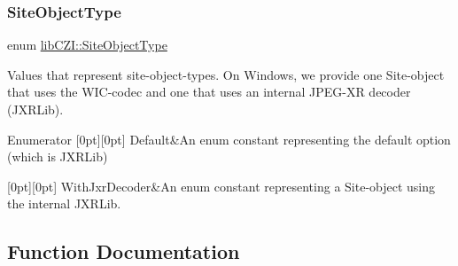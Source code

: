 \mbox{\label{namespacelib_c_z_i_a77743727a5f0709a64237e58b9254983}} 
\subsubsection{\texorpdfstring{Site\+Object\+Type}{SiteObjectType}}
{\footnotesize\ttfamily enum \hyperlink{namespacelib_c_z_i_a77743727a5f0709a64237e58b9254983}{lib\+C\+Z\+I\+::\+Site\+Object\+Type}\hspace{0.3cm}{\ttfamily [strong]}}

Values that represent site-\/object-\/types. On Windows, we provide one Site-\/object that uses the W\+I\+C-\/codec and one that uses an internal J\+P\+E\+G-\/\+XR decoder (J\+X\+R\+Lib). \begin{DoxyEnumFields}{Enumerator}
[0pt][0pt]{}\mbox{\label{namespacelib_c_z_i_a77743727a5f0709a64237e58b9254983a7a1920d61156abc05a60135aefe8bc67}} 
Default&An enum constant representing the default option (which is J\+X\+R\+Lib) \\
\hline

[0pt][0pt]{}\mbox{\label{namespacelib_c_z_i_a77743727a5f0709a64237e58b9254983a6cdacd623c3a47d457783e5410437a42}} 
With\+Jxr\+Decoder&An enum constant representing a Site-\/object using the internal J\+X\+R\+Lib. \\
\hline

\end{DoxyEnumFields}


\subsection{Function Documentation}
\mbox{\label{namespacelib_c_z_i_a036375c3761cc8ea54022d37000ae0ae}} 
